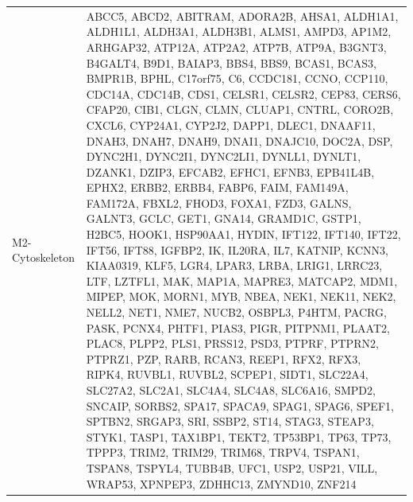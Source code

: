 \documentclass[
]{article}
\begin{document}
\begin{singlespace}
\begin{longtable}[t]{>{\raggedright\arraybackslash}p{1in}>{\raggedright\arraybackslash}p{5in}}
\endfoot
\bottomrule
\endlastfoot
M2-Cytoskeleton & ABCC5, ABCD2, ABITRAM, ADORA2B, AHSA1, ALDH1A1, ALDH1L1, ALDH3A1, ALDH3B1, ALMS1, AMPD3, AP1M2, ARHGAP32, ATP12A, ATP2A2, ATP7B, ATP9A, B3GNT3, B4GALT4, B9D1, BAIAP3, BBS4, BBS9, BCAS1, BCAS3, BMPR1B, BPHL, C17orf75, C6, CCDC181, CCNO, CCP110, CDC14A, CDC14B, CDS1, CELSR1, CELSR2, CEP83, CERS6, CFAP20, CIB1, CLGN, CLMN, CLUAP1, CNTRL, CORO2B, CXCL6, CYP24A1, CYP2J2, DAPP1, DLEC1, DNAAF11, DNAH3, DNAH7, DNAH9, DNAI1, DNAJC10, DOC2A, DSP, DYNC2H1, DYNC2I1, DYNC2LI1, DYNLL1, DYNLT1, DZANK1, DZIP3, EFCAB2, EFHC1, EFNB3, EPB41L4B, EPHX2, ERBB2, ERBB4, FABP6, FAIM, FAM149A, FAM172A, FBXL2, FHOD3, FOXA1, FZD3, GALNS, GALNT3, GCLC, GET1, GNA14, GRAMD1C, GSTP1, H2BC5, HOOK1, HSP90AA1, HYDIN, IFT122, IFT140, IFT22, IFT56, IFT88, IGFBP2, IK, IL20RA, IL7, KATNIP, KCNN3, KIAA0319, KLF5, LGR4, LPAR3, LRBA, LRIG1, LRRC23, LTF, LZTFL1, MAK, MAP1A, MAPRE3, MATCAP2, MDM1, MIPEP, MOK, MORN1, MYB, NBEA, NEK1, NEK11, NEK2, NELL2, NET1, NME7, NUCB2, OSBPL3, P4HTM, PACRG, PASK, PCNX4, PHTF1, PIAS3, PIGR, PITPNM1, PLAAT2, PLAC8, PLPP2, PLS1, PRSS12, PSD3, PTPRF, PTPRN2, PTPRZ1, PZP, RARB, RCAN3, REEP1, RFX2, RFX3, RIPK4, RUVBL1, RUVBL2, SCPEP1, SIDT1, SLC22A4, SLC27A2, SLC2A1, SLC4A4, SLC4A8, SLC6A16, SMPD2, SNCAIP, SORBS2, SPA17, SPACA9, SPAG1, SPAG6, SPEF1, SPTBN2, SRGAP3, SRI, SSBP2, ST14, STAG3, STEAP3, STYK1, TASP1, TAX1BP1, TEKT2, TP53BP1, TP63, TP73, TPPP3, TRIM2, TRIM29, TRIM68, TRPV4, TSPAN1, TSPAN8, TSPYL4, TUBB4B, UFC1, USP2, USP21, VILL, WRAP53, XPNPEP3, ZDHHC13, ZMYND10, ZNF214\\

\end{longtable}
\end{singlespace}
\end{document}

